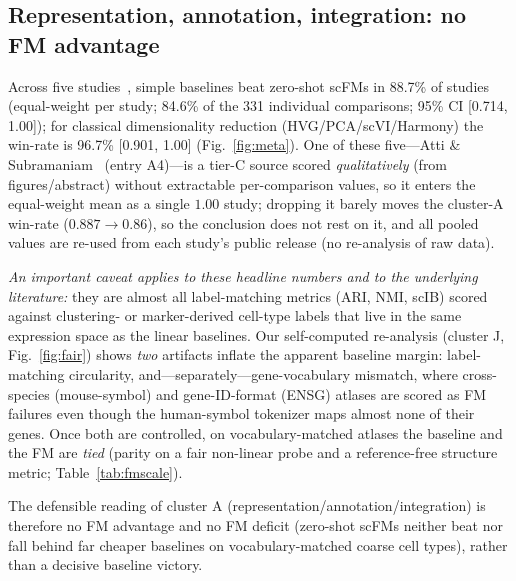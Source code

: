 \documentclass[11pt]{article}
\begin{document}
\subsection{Representation, annotation, integration: no FM advantage}
Across five studies~\cite{kedzierska2025,boiarsky2024,wu2025,atti2025,bendidi2024}, simple baselines beat zero-shot scFMs in 88.7\% of studies (equal-weight per study; 84.6\% of the 331 individual comparisons; 95\% CI [0.714, 1.00]); for classical dimensionality reduction (HVG/PCA/scVI/Harmony) the win-rate is 96.7\% [0.901, 1.00] (Fig.~\ref{fig:meta}). One of these five---Atti \& Subramaniam~\cite{atti2025} (entry A4)---is a tier-C source scored \emph{qualitatively} (from figures/abstract) without extractable per-comparison values, so it enters the equal-weight mean as a single $1.00$ study; dropping it barely moves the cluster-A win-rate ($0.887\!\to\!0.86$), so the conclusion does not rest on it, and all pooled values are re-used from each study's public release (no re-analysis of raw data).

\emph{An important caveat applies to these headline numbers and to the underlying literature:} they are almost all label-matching metrics (ARI, NMI, scIB) scored against clustering- or marker-derived cell-type labels that live in the same expression space as the linear baselines. Our self-computed re-analysis (cluster J, Fig.~\ref{fig:fair}) shows \emph{two} artifacts inflate the apparent baseline margin: label-matching circularity, and---separately---gene-vocabulary mismatch, where cross-species (mouse-symbol) and gene-ID-format (ENSG) atlases are scored as FM failures even though the human-symbol tokenizer maps almost none of their genes. Once both are controlled, on vocabulary-matched atlases the baseline and the FM are \emph{tied} (parity on a fair non-linear probe and a reference-free structure metric; Table~\ref{tab:fmscale}).

The defensible reading of cluster A (representation/annotation/integration) is therefore no FM advantage and no FM deficit (zero-shot scFMs neither beat nor fall behind far cheaper baselines on vocabulary-matched coarse cell types), rather than a decisive baseline victory.
\end{document}
